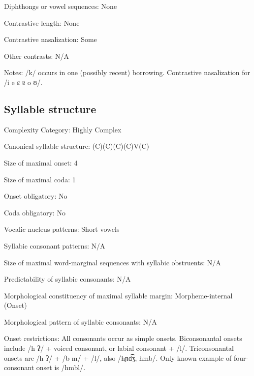{\begin{appendixdesc}
\item[Diphthongs or vowel sequences:] None

\item[Contrastive length:] None

\item[Contrastive nasalization:] Some

\item[Other contrasts:] N/A

\item[Notes:] /k/ occurs in one (possibly recent) borrowing. Contrastive nasalization for /i e ɛ ɐ o ʊ/.
\end{appendixdesc}
\subsection*{Syllable structure}
\begin{appendixdesc}

\item[Complexity Category:] Highly Complex

\item[Canonical syllable structure:] (C)(C)(C)(C)V(C) \citep[68--76]{Marmion2010}

\item[Size of maximal onset:] 4

\item[Size of maximal coda:] 1

\item[Onset obligatory:] No

\item[Coda obligatory:] No

\item[Vocalic nucleus patterns:] Short vowels

\item[Syllabic consonant patterns:] N/A

\item[Size of maximal word-marginal sequences with syllabic obstruents:] N/A

\item[Predictability of syllabic consonants:] N/A

\item[Morphological constituency of maximal syllable margin:] Morpheme-internal (Onset)

\item[Morphological pattern of syllabic consonants:] N/A

\item[Onset restrictions:] All consonants occur as simple onsets. Biconsonantal onsets include /h ʔ/ + voiced consonant, or labial consonant + /l/. Triconsonantal onsets are /h ʔ/ + /b m/ + /l/, also /hɲd͡ʒ, hmb/. Only known example of four-consonant onset is /hmbl/.


\end{appendixdesc}}
